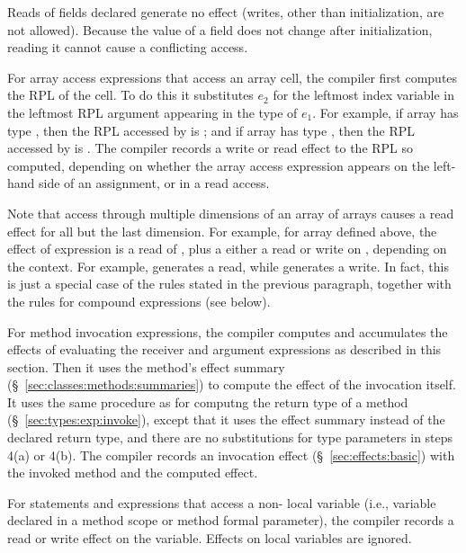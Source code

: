 Reads of fields declared  generate no effect (writes, other
than initialization, are not allowed).  Because the value of
a  field does not change after initialization, reading it
cannot cause a conflicting access.

 For array access expressions 
that access an array cell, the compiler first computes the RPL of the
cell.  To do this it substitutes $e_2$ for the leftmost index variable
in the leftmost RPL argument appearing in the type of $e_1$.  For
example, if array  has type , then the RPL
accessed by  is \kwd{[i]}; and if array  has type
, then the RPL accessed by 
is \kwd{[0]}.  The compiler records a write or read effect to the RPL
so computed, depending on whether the array access expression appears
on the left-hand side of an assignment, or in a read access.

Note that access through multiple dimensions of an array of arrays
causes a read effect for all but the last dimension.  For example, for
array  defined above, the effect of expression  is
a read of \kwd{[0]}, plus a either a read or write on \kwd{[0]:[1]},
depending on the context.  For example,  generates a
read, while  generates a write.  In fact, this is
just a special case of the rules stated in the previous paragraph,
together with the rules for compound expressions (see below).

 For method invocation expressions, the
compiler computes and accumulates the effects of evaluating the
receiver and argument expressions as described in this section.  Then
it uses the method's effect summary
(\S~\ref{sec:classes:methods:summaries}) to compute the effect of the
invocation itself.  It uses the same procedure as for computng the
return type of a method (\S~\ref{sec:types:exp:invoke}), except that
it uses the effect summary instead of the declared return type, and
there are no substitutions for type parameters in steps 4(a) or 4(b).
The compiler records an invocation effect (\S~\ref{sec:effects:basic})
with the invoked method and the computed effect.

  For statements and expressions that
access a non- local variable (i.e., variable declared in a
method scope or method formal parameter), the compiler records a read
or write effect on the variable.  Effects on  local
variables are ignored.

